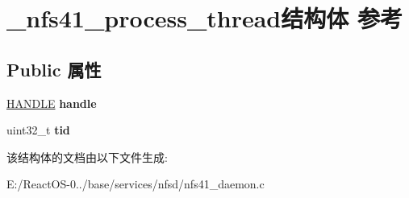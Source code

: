 \hypertarget{struct__nfs41__process__thread}{}\section{\+\_\+nfs41\+\_\+process\+\_\+thread结构体 参考}
\label{struct__nfs41__process__thread}
\subsection*{Public 属性}
\begin{DoxyCompactItemize}
\item 
\mbox{\label{struct__nfs41__process__thread_ad9e5a290aae82fe91d8705887c8c09da}} 
\hyperlink{interfacevoid}{H\+A\+N\+D\+LE} {\bfseries handle}
\item 
\mbox{\label{struct__nfs41__process__thread_ae0bd927a73448d2024fe48124c5050dd}} 
uint32\+\_\+t {\bfseries tid}
\end{DoxyCompactItemize}


该结构体的文档由以下文件生成\+:\begin{DoxyCompactItemize}
\item 
E\+:/\+React\+O\+S-\/0../base/services/nfsd/nfs41\+\_\+daemon.\+c\end{DoxyCompactItemize}
